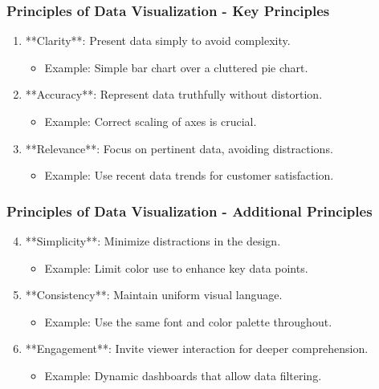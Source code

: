 \documentclass{beamer}
\begin{document}
\begin{frame}[fragile]
    \frametitle{Principles of Data Visualization - Key Principles}
    \begin{enumerate}
        \item **Clarity**: Present data simply to avoid complexity.
              \begin{itemize}
                  \item Example: Simple bar chart over a cluttered pie chart.
              \end{itemize}    
        \item **Accuracy**: Represent data truthfully without distortion.
              \begin{itemize}
                  \item Example: Correct scaling of axes is crucial.
              \end{itemize}
        \item **Relevance**: Focus on pertinent data, avoiding distractions.
              \begin{itemize}
                  \item Example: Use recent data trends for customer satisfaction.
              \end{itemize}
    \end{enumerate}
\end{frame}

\begin{frame}[fragile]
    \frametitle{Principles of Data Visualization - Additional Principles}
    \begin{enumerate}
        \setcounter{enumi}{3}
        \item **Simplicity**: Minimize distractions in the design.
              \begin{itemize}
                  \item Example: Limit color use to enhance key data points.
              \end{itemize}
        \item **Consistency**: Maintain uniform visual language.
              \begin{itemize}
                  \item Example: Use the same font and color palette throughout.
              \end{itemize}
        \item **Engagement**: Invite viewer interaction for deeper comprehension.
              \begin{itemize}
                  \item Example: Dynamic dashboards that allow data filtering.
              \end{itemize}
    \end{enumerate}
\end{frame}
\end{document}
